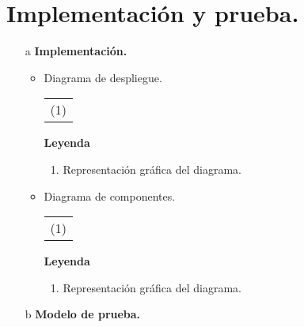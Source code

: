 \chapter{\large Implementación y prueba.}


\pagestyle{fancy}
\lhead{}
\chead{}
\lfoot{}
\cfoot{}
\rfoot{\thepage}
\renewcommand{\headrulewidth}{0.4pt}
 \vspace{-1cm}

\begin{enumerate}
 \item[a] {\bf \lettrine[lines=2, lraise=0, nindent=0em, slope=-.5em]{I}{}mplementación.}
  \begin{itemize}
    \item Diagrama de despliegue.
    \begin{longtable}[c]{|l|}
      \hline
      \rowcolor{gray}
      \multicolumn{1}{|>{\columncolor{Light}}c|}{DIAGRAMA DE DESPLIEGUE}\\
      \hline
      \multicolumn{1}{|c|}{(1)}\\
      \hline
    \end{longtable}
    {\bf Leyenda}
    \begin{enumerate}
     \item Representación gráfica del diagrama.
    \end{enumerate}

  \item Diagrama de componentes.
    \begin{longtable}[c]{|l|}
      \hline
      \rowcolor{gray}
      \multicolumn{1}{|>{\columncolor{Light}}c|}{DIAGRAMA DE COMPONENTES}\\
      \hline
      \multicolumn{1}{|c|}{(1)}\\
      \hline
    \end{longtable}
    {\bf Leyenda}
    \begin{enumerate}
     \item Representación gráfica del diagrama.
    \end{enumerate}
  \end{itemize}

  
 \item[b] {\bf Modelo de prueba.}


\end{enumerate}
